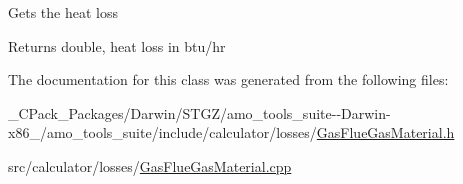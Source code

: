 Gets the heat loss

\begin{DoxyReturn}{Returns}
double, heat loss in btu/hr 
\end{DoxyReturn}


The documentation for this class was generated from the following files\+:\begin{DoxyCompactItemize}
\item 
\+\_\+\+C\+Pack\+\_\+\+Packages/\+Darwin/\+S\+T\+G\+Z/amo\+\_\+tools\+\_\+suite-\/-\/\+Darwin-\/x86\+\_/amo\+\_\+tools\+\_\+suite/include/calculator/losses/\hyperlink{___c_pack___packages_2_darwin_2_s_t_g_z_2amo__tools__suite--_darwin-x86__64_2amo__tools__suite_2004d7ef7737e3755a6d819de5baaee93}{Gas\+Flue\+Gas\+Material.\+h}\item 
src/calculator/losses/\hyperlink{_gas_flue_gas_material_8cpp}{Gas\+Flue\+Gas\+Material.\+cpp}\end{DoxyCompactItemize}
